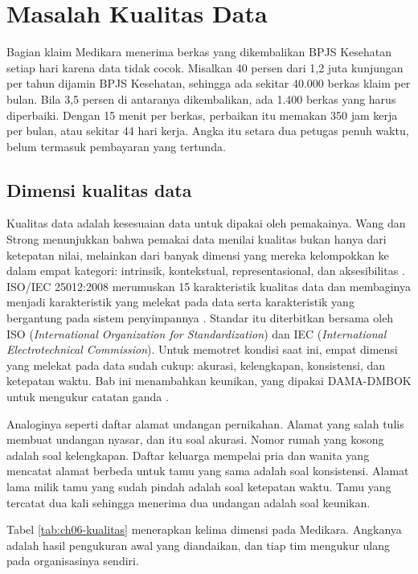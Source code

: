 \section{Masalah Kualitas Data}

Bagian klaim Medikara menerima berkas yang dikembalikan BPJS Kesehatan
setiap hari karena data tidak cocok. Misalkan 40 persen dari 1,2 juta kunjungan
per tahun dijamin BPJS Kesehatan, sehingga ada sekitar 40.000 berkas klaim per
bulan. Bila 3,5 persen di antaranya dikembalikan, ada 1.400 berkas yang harus
diperbaiki. Dengan 15 menit per berkas, perbaikan itu memakan 350 jam kerja per
bulan, atau sekitar 44 hari kerja. Angka itu setara dua petugas penuh waktu,
belum termasuk pembayaran yang tertunda.

\subsection*{Dimensi kualitas data}

Kualitas data adalah kesesuaian data untuk dipakai oleh pemakainya. Wang dan
Strong menunjukkan bahwa pemakai data menilai kualitas bukan hanya dari
ketepatan nilai, melainkan dari banyak dimensi yang mereka kelompokkan ke
dalam empat kategori: intrinsik, kontekstual, representasional, dan
aksesibilitas \cite{c06-wang1996}. ISO/IEC 25012:2008 merumuskan 15
karakteristik kualitas data dan membaginya menjadi karakteristik yang melekat
pada data serta karakteristik yang bergantung pada sistem penyimpannya
\cite{c06-iso25012}. Standar itu diterbitkan bersama oleh ISO
(\textit{International Organization for Standardization}) dan IEC
(\textit{International Electrotechnical Commission}). Untuk memotret kondisi saat ini, empat dimensi yang
melekat pada data sudah cukup: akurasi, kelengkapan, konsistensi, dan
ketepatan waktu. Bab ini menambahkan keunikan, yang dipakai DAMA-DMBOK untuk
mengukur catatan ganda \cite{dmbok2}.

Analoginya seperti daftar alamat undangan pernikahan. Alamat yang salah tulis
membuat undangan nyasar, dan itu soal akurasi. Nomor rumah yang kosong adalah
soal kelengkapan. Daftar keluarga mempelai pria dan wanita yang mencatat alamat
berbeda untuk tamu yang sama adalah soal konsistensi. Alamat lama milik tamu
yang sudah pindah adalah soal ketepatan waktu. Tamu yang tercatat dua kali
sehingga menerima dua undangan adalah soal keunikan.

Tabel \ref{tab:ch06-kualitas} menerapkan kelima dimensi pada Medikara. Angkanya
adalah hasil pengukuran awal yang diandaikan, dan tiap tim mengukur ulang pada
organisasinya sendiri.

